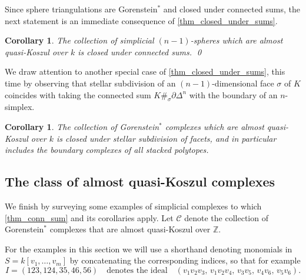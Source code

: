 \documentclass[a4paper,10pt]{amsart}
\newtheorem{corollary}[theorem]{Corollary}
\theoremstyle{definition}
\theoremstyle{remark}
\begin{document}
Since sphere triangulations are Gorenstein$^*$ and closed under connected sums, the next statement is an immediate consequence of \cref{thm_closed_under_sums}.

\begin{corollary}\label{cor_sphere_sums}
The collection of simplicial $(n-1)$-spheres which are almost quasi-Koszul over $k$ is closed under connected sums. \qed
\end{corollary}

We draw attention to another special case of \cref{thm_closed_under_sums}, this time by observing that stellar subdivision of an $(n-1)$-dimensional face $\sigma$ of $K$ coincides with taking the connected sum $K\#_\sigma \partial\Delta^n$ with the boundary of an $n$-simplex.

\begin{corollary}\label{cor_stellar}
The collection of Gorenstein$^*$ complexes which are almost quasi-Koszul over $k$ is closed under stellar subdivision of facets, and in particular includes the boundary complexes of all stacked polytopes.
\end{corollary}


\subsection*{The class of almost quasi-Koszul complexes}
We finish by surveying some examples of simplicial complexes to which \cref{thm_conn_sum} and its corollaries apply. Let $\mathcal{C}$ denote the collection of Gorenstein$^*$ complexes that are almost quasi-Koszul over $\mathbb{Z}$.

For the examples in this section we will use a shorthand denoting monomials in $S=k[v_1,\ldots,v_m]$ by concatenating the corresponding indices, so that for example
\[
I=(123,124,35,46,56)\quad\text{denotes the ideal}\quad \left(v_{1}v_{2}v_{3},\,v_{1}v_{2}v_{4},\,v_{3}v_{5},\,v_{4}v_{6},\,v_{5}v_{6}\right).
\]
\end{document}
